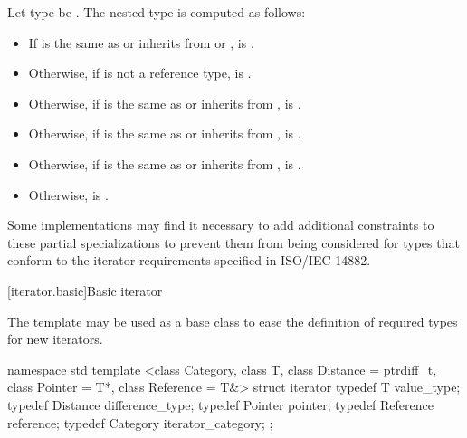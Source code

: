 \begin{addedblock}
\pnum
Let type  be .
The nested type  is computed as
follows:
\begin{itemize}
\item If  is the same as or inherits from  or
      , 
      is .
\item Otherwise, if  is not a reference type,
       is .
\item Otherwise, if  is the same as or inherits from ,
       is .
\item Otherwise, if  is the same as or inherits from ,
       is .
\item Otherwise, if  is the same as or inherits from ,
       is .
\item Otherwise,  is .
\end{itemize}

\pnum
\enternote Some implementations may find it necessary to add additional constraints to
these partial specializations to prevent them from being considered for types that
conform to the iterator requirements specified in ISO/IEC 14882.\exitnote
\end{addedblock}

\begin{removedblock}
[iterator.basic]{Basic iterator}

\pnum
The
template may be used as a base class to ease the definition of required types
for new iterators.

\begin{codeblock}
namespace std {
  template <class Category, class T, class Distance = ptrdiff_t,
    class Pointer = T*, class Reference = T&>
  struct iterator {
    typedef T         value_type;
    typedef Distance  difference_type;
    typedef Pointer   pointer;
    typedef Reference reference;
    typedef Category  iterator_category;
  };
}
\end{codeblock}
\end{removedblock}

